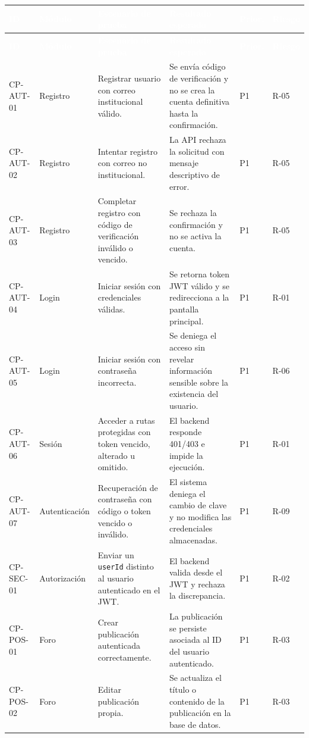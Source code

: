 \documentclass[11pt,a4paper]{article}
\newcommand{\thead}[1]{\textcolor{white}{\textbf{#1}}}
\begin{document}
\footnotesize
\begin{longtable}{p{1.25cm}p{2.5cm}p{3.55cm}p{4.35cm}p{0.7cm}p{0.95cm}}
\rowcolor{uniwayblue}\thead{ID} & \thead{Módulo} & \thead{Escenario de prueba} & \thead{Resultado esperado} & \thead{Prior.} & \thead{Riesgo}\\
\endfirsthead
\rowcolor{uniwayblue}\thead{ID} & \thead{Módulo} & \thead{Escenario de prueba} & \thead{Resultado esperado} & \thead{Prior.} & \thead{Riesgo}\\
\endhead
CP-AUT-01 & Registro & Registrar usuario con correo institucional válido. & Se envía código de verificación y no se crea la cuenta definitiva hasta la confirmación. & P1 & R-05\\
\rowcolor{lightgray}CP-AUT-02 & Registro & Intentar registro con correo no institucional. & La API rechaza la solicitud con mensaje descriptivo de error. & P1 & R-05\\
CP-AUT-03 & Registro & Completar registro con código de verificación inválido o vencido. & Se rechaza la confirmación y no se activa la cuenta. & P1 & R-05\\
\rowcolor{lightgray}CP-AUT-04 & Login & Iniciar sesión con credenciales válidas. & Se retorna token JWT válido y se redirecciona a la pantalla principal. & P1 & R-01\\
CP-AUT-05 & Login & Iniciar sesión con contraseña incorrecta. & Se deniega el acceso sin revelar información sensible sobre la existencia del usuario. & P1 & R-06\\
\rowcolor{lightgray}CP-AUT-06 & Sesión & Acceder a rutas protegidas con token vencido, alterado u omitido. & El backend responde 401/403 e impide la ejecución. & P1 & R-01\\
CP-AUT-07 & Autenticación & Recuperación de contraseña con código o token vencido o inválido. & El sistema deniega el cambio de clave y no modifica las credenciales almacenadas. & P1 & R-09\\
\rowcolor{lightgray}CP-SEC-01 & Autorización & Enviar un \texttt{userId} distinto al usuario autenticado en el JWT. & El backend valida desde el JWT y rechaza la discrepancia. & P1 & R-02\\
CP-POS-01 & Foro & Crear publicación autenticada correctamente. & La publicación se persiste asociada al ID del usuario autenticado. & P1 & R-03\\
\rowcolor{lightgray}CP-POS-02 & Foro & Editar publicación propia. & Se actualiza el título o contenido de la publicación en la base de datos. & P1 & R-03\\

\end{longtable}
\end{document}
